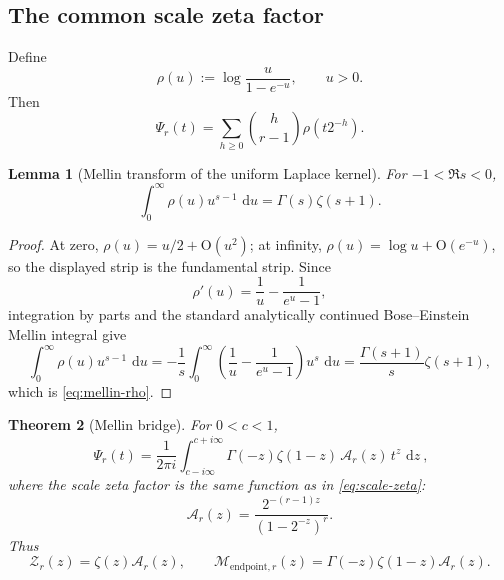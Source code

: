 \documentclass[11pt,a4paper]{article}
\theoremstyle{frontier}
\newtheorem{theorem}{Theorem}[section]
\newtheorem{lemma}[theorem]{Lemma}
\theoremstyle{definition}
\newcommand{\dd}{\,\mathrm d}
\newcommand{\bigO}{\mathrm O}
\begin{document}
\subsection{The common scale zeta factor}

Define
\begin{equation}\label{eq:rho}
  \rho(u):=\log\frac{u}{1-e^{-u}},\qquad u>0.
\end{equation}
Then
\begin{equation}\label{eq:Psi-harmonic-sum}
  \Psi_r(t)=\sum_{h\ge0}\binom h{r-1}\rho(t2^{-h}).
\end{equation}

\begin{lemma}[Mellin transform of the uniform Laplace kernel]\label{lem:mellin-rho}
For $-1<\Re s<0$,
\begin{equation}\label{eq:mellin-rho}
 \int_0^{\infty}\rho(u)u^{s-1}\,\dd u
 =\Gamma(s)\zeta(s+1).
\end{equation}
\end{lemma}

\begin{proof}
At zero, $\rho(u)=u/2+\bigO(u^2)$; at infinity, $\rho(u)=\log u+\bigO(e^{-u})$, so the displayed strip is the fundamental strip.  Since
\[
 \rho'(u)=\frac1u-\frac1{e^u-1},
\]
integration by parts and the standard analytically continued Bose--Einstein Mellin integral give
\[
 \int_0^\infty\rho(u)u^{s-1}\,\dd u
 =-\frac1s\int_0^\infty
 \left(\frac1u-\frac1{e^u-1}\right)u^s\,\dd u
 =\frac{\Gamma(s+1)}s\zeta(s+1),
\]
which is \eqref{eq:mellin-rho}.
\end{proof}

\begin{theorem}[Mellin bridge]\label{thm:mellin-bridge}
For $0<c<1$,
\begin{equation}\label{eq:mellin-bridge}
 \boxed{\ 
 \Psi_r(t)=\frac1{2\pi i}
 \int_{c-i\infty}^{c+i\infty}
 \Gamma(-z)\zeta(1-z)\,
 \mathcal A_r(z)\,t^z\,\dd z
 \ },
\end{equation}
where the scale zeta factor is the same function as in \eqref{eq:scale-zeta}:
\begin{equation}\label{eq:scale-zeta-repeat}
  \mathcal A_r(z)=\frac{2^{-(r-1)z}}{(1-2^{-z})^r}.
\end{equation}
Thus
\begin{equation}\label{eq:two-zeta-uses}
 \mathcal Z_r(z)=\zeta(z)\mathcal A_r(z),
 \qquad
 \mathcal M_{\mathrm{endpoint},r}(z)
 =\Gamma(-z)\zeta(1-z)\mathcal A_r(z).
\end{equation}
\end{theorem}
\end{document}

